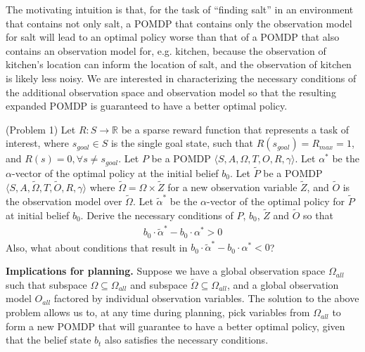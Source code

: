 \documentclass{article}
\newcommand{\td}[1]{\tilde{#1}}
\begin{document}
The motivating intuition is that, for the task of ``finding salt'' in an environment that contains not only salt, a POMDP that contains only the observation model for salt will lead to an optimal policy worse than that of a POMDP that also contains an observation model for, e.g. kitchen, because the observation of kitchen's location can inform the location of salt, and the observation of kitchen is likely less noisy. We are interested in characterizing the necessary conditions of the additional observation space and observation model so that the resulting expanded POMDP is guaranteed to have a better optimal policy.

\begin{definition}(Problem 1)
Let $R:S\rightarrow \mathbb{R}$ be a sparse reward function that represents a
task of interest, where $s_{goal}\in S$ is the single goal state, such that
$R(s_{goal})=R_{max}=1$, and $R(s)=0, \forall s \neq s_{goal}$.
Let $P$ be a POMDP $\langle S, A, \Omega, T, O, R, \gamma  \rangle$. Let $\alpha^*$ be the $\alpha$-vector of the optimal policy at the initial belief $b_0$. Let $\td{P}$ be a POMDP $\langle S, A, \td{\Omega}, T, \td{O}, R, \gamma  \rangle$ where $\td{\Omega}=\Omega\times\td{Z}$ for a new observation variable $\td{Z}$, and $\td{O}$ is the observation model over $\td{\Omega}$. Let $\td{\alpha}^*$ be the $\alpha$-vector of the optimal policy for $\td{P}$ at initial belief $b_0$. Derive the necessary conditions of $P$, $b_0$, $\td{Z}$ and $\td{O}$ so that
\begin{align}
b_0\cdot \td{\alpha}^* - b_0\cdot \alpha^* > 0
\end{align}
Also, what about conditions that result in $b_0\cdot \td{\alpha}^* - b_0\cdot \alpha^* < 0$?
\end{definition}

\noindent \textbf{Implications for planning.} Suppose we have a global observation space $\Omega_{all}$ such that subspace $\Omega \subseteq \Omega_{all}$ and subspace $\td{\Omega} \subseteq \Omega_{all}$, and a global observation model $O_{all}$ factored by individual observation variables. The solution to the above problem allows us to, at any time during planning, pick variables from $\Omega_{all}$ to form a new POMDP that will guarantee to have a better optimal policy, given that the belief state $b_t$ also satisfies the necessary conditions.
\end{document}
